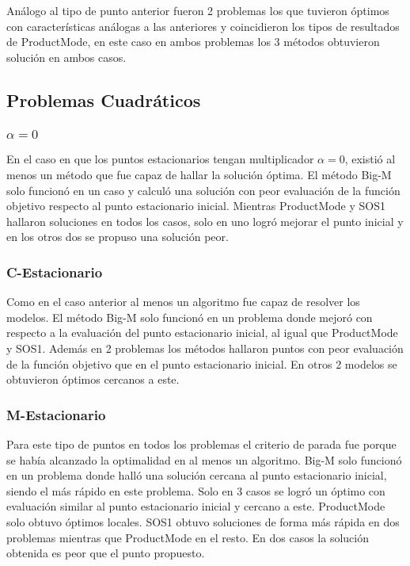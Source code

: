 Análogo al tipo de punto anterior  
fueron 2 problemas los que tuvieron óptimos 
con características análogas a las anteriores y 
coincidieron los tipos de resultados de ProductMode, 
en este caso en ambos problemas los 3 métodos obtuvieron solución en ambos casos. 
   



\subsection{Problemas Cuadráticos}


\subsubsection{$\alpha =0$}
En el caso en que los puntos estacionarios tengan multiplicador $\alpha=0$, 
existió al menos un método que fue capaz de hallar la solución óptima. 
El método Big-M solo funcionó en un caso y calculó una solución con peor 
evaluación de la función objetivo respecto al punto estacionario inicial. 
Mientras ProductMode y SOS1 hallaron soluciones en todos los casos, 
solo en uno logró mejorar el punto inicial y en los otros dos se propuso una solución peor.
\subsubsection{C-Estacionario}   
Como en  el caso anterior al menos un algoritmo fue capaz de resolver los modelos. 
El método Big-M solo funcionó en un problema donde mejoró con respecto a la evaluación del punto estacionario inicial, al igual que  ProductMode y SOS1. Además en 2 problemas los métodos hallaron puntos con peor evaluación de la función objetivo que en el punto estacionario inicial. En otros 2 modelos se obtuvieron óptimos cercanos a este.



    
\subsubsection{M-Estacionario}
  
Para este tipo de puntos en todos los problemas el criterio de parada fue porque se había alcanzado la optimalidad en al menos un 
algoritmo.
Big-M solo funcionó en un problema donde halló una solución cercana al punto estacionario inicial, siendo el más rápido 
en este problema. Solo en 3 casos  se logró  un óptimo con evaluación  similar al punto estacionario inicial  y  cercano a este. 
ProductMode solo obtuvo óptimos locales. SOS1 obtuvo soluciones de forma más rápida en dos problemas mientras que ProductMode en el 
resto. En dos casos la solución obtenida es peor que el punto propuesto.
    
